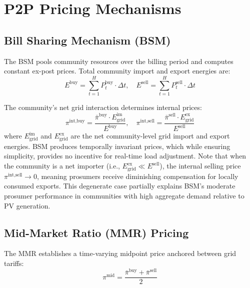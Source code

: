 \documentclass[pdflatex,sn-mathphys-num]{sn-jnl}
\theoremstyle{thmstyleone}
\theoremstyle{thmstyletwo}
\begin{document}
\section{P2P Pricing Mechanisms}\label{sec:mechanisms}

\subsection{Bill Sharing Mechanism (BSM)}

The BSM pools community resources over the billing period and computes constant ex-post prices. Total community import and export energies are:
\begin{equation}
    E^{\text{buy}} = \sum_{t=1}^{H} P_t^{\text{buy}} \cdot \Delta t, \quad E^{\text{sell}} = \sum_{t=1}^{H} P_t^{\text{sell}} \cdot \Delta t
    \label{eq:bsm_energy}
\end{equation}

The community's net grid interaction determines internal prices:
\begin{equation}
    \pi^{\text{int,buy}} = \frac{\bar{\pi}^{\text{buy}} \cdot E_{\text{grid}}^{\text{im}}}{E^{\text{buy}}}, \quad \pi^{\text{int,sell}} = \frac{\bar{\pi}^{\text{sell}} \cdot E_{\text{grid}}^{\text{ex}}}{E^{\text{sell}}}
    \label{eq:bsm_prices}
\end{equation}
where $E_{\text{grid}}^{\text{im}}$ and $E_{\text{grid}}^{\text{ex}}$ are the net community-level grid import and export energies. BSM produces temporally invariant prices, which while ensuring simplicity, provides no incentive for real-time load adjustment. Note that when the community is a net importer (i.e., $E_{\text{grid}}^{\text{ex}} \ll E^{\text{sell}}$), the internal selling price $\pi^{\text{int,sell}} \to 0$, meaning prosumers receive diminishing compensation for locally consumed exports. This degenerate case partially explains BSM's moderate prosumer performance in communities with high aggregate demand relative to PV generation.

\subsection{Mid-Market Ratio (MMR) Pricing}

The MMR establishes a time-varying midpoint price anchored between grid tariffs:
\begin{equation}
    \pi^{\text{mid}} = \frac{\bar{\pi}^{\text{buy}} + \bar{\pi}^{\text{sell}}}{2}
    \label{eq:mmr_mid}
\end{equation}
\end{document}
